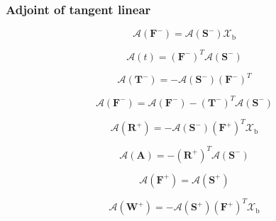 \subsubsection{Adjoint of tangent linear}
\label{sec:solar_source-global_solar_source-adjoint_of_tangent_linear}

\begin{equation}
\mathcal{A}(\mathbf{F}^{-}) = \mathcal{A}(\mathbf{S}^{-})\mathcal{X}_{\mathrm{b}}
\label{eq:solar_source-global_solar_source-adjoint_of_tangent_linear-f_m_a}
\end{equation}

\begin{equation}
\mathcal{A}(t) = (\mathbf{F}^{-})^{T}\mathcal{A}(\mathbf{S}^{-})
\label{eq:solar_source-global_solar_source-adjoint_of_tangent_linear-t_a}
\end{equation}

\begin{equation}
\mathcal{A}(\mathbf{T}^{-}) = -\mathcal{A}(\mathbf{S}^{-})(\mathbf{F}^{-})^{T}
\label{eq:solar_source-global_solar_source-adjoint_of_tangent_linear-T_m_a}
\end{equation}

\begin{equation}
\mathcal{A}(\mathbf{F}^{-}) = \mathcal{A}(\mathbf{F}^{-}) - (\mathbf{T}^{-})^{T}\mathcal{A}(\mathbf{S}^{-})
\label{eq:solar_source-global_solar_source-adjoint_of_tangent_linear-f_m_a2}
\end{equation}

\begin{equation}
\mathcal{A}(\mathbf{R}^{+}) = -\mathcal{A}(\mathbf{S}^{-})(\mathbf{F}^{+})^{T}\mathcal{X}_{\mathrm{b}}
\label{eq:solar_source-global_solar_source-adjoint_of_tangent_linear-R_p_a}
\end{equation}

\begin{equation}
\mathcal{A}(\mathbf{A}) = -(\mathbf{R}^{+})^{T}\mathcal{A}(\mathbf{S}^{-})
\label{eq:solar_source-global_solar_source-adjoint_of_tangent_linear-A_a}
\end{equation}

\begin{equation}
\mathcal{A}(\mathbf{F}^{+}) = \mathcal{A}(\mathbf{S}^{+})
\label{eq:solar_source-global_solar_source-adjoint_of_tangent_linear-f_p_a}
\end{equation}

\begin{equation}
\mathcal{A}(\mathbf{W}^{+}) = -\mathcal{A}(\mathbf{S}^{+})(\mathbf{F}^{+})^{T}\mathcal{X}_{\mathrm{b}}
\label{eq:solar_source-global_solar_source-adjoint_of_tangent_linear-T_p_a}
\end{equation}

